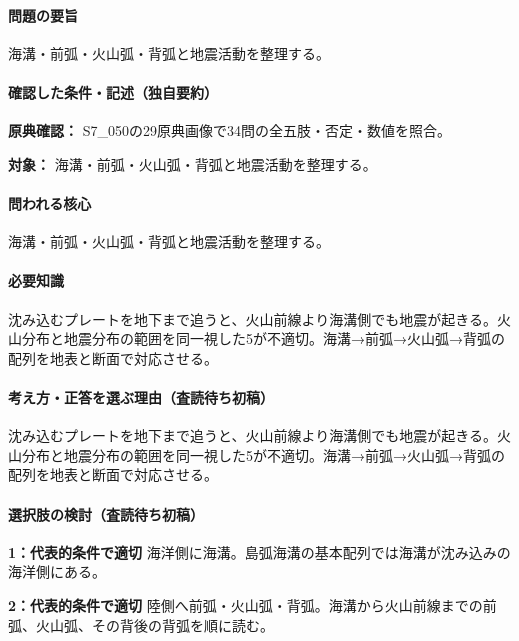 \paragraph{問題の要旨} 海溝・前弧・火山弧・背弧と地震活動を整理する。

\paragraph{確認した条件・記述（独自要約）}\mbox{}\par

\noindent\textbf{原典確認：} S7\_050の29原典画像で34問の全五肢・否定・数値を照合。\par

\noindent\textbf{対象：} 海溝・前弧・火山弧・背弧と地震活動を整理する。\par

\paragraph{問われる核心} 海溝・前弧・火山弧・背弧と地震活動を整理する。

\paragraph{必要知識} 沈み込むプレートを地下まで追うと、火山前線より海溝側でも地震が起きる。火山分布と地震分布の範囲を同一視した5が不適切。海溝→前弧→火山弧→背弧の配列を地表と断面で対応させる。

\paragraph{考え方・正答を選ぶ理由（査読待ち初稿）} 沈み込むプレートを地下まで追うと、火山前線より海溝側でも地震が起きる。火山分布と地震分布の範囲を同一視した5が不適切。海溝→前弧→火山弧→背弧の配列を地表と断面で対応させる。

\paragraph{選択肢の検討（査読待ち初稿）}\mbox{}\par

\noindent\textbf{1：代表的条件で適切} 海洋側に海溝。島弧海溝の基本配列では海溝が沈み込みの海洋側にある。\par

\noindent\textbf{2：代表的条件で適切} 陸側へ前弧・火山弧・背弧。海溝から火山前線までの前弧、火山弧、その背後の背弧を順に読む。\par

